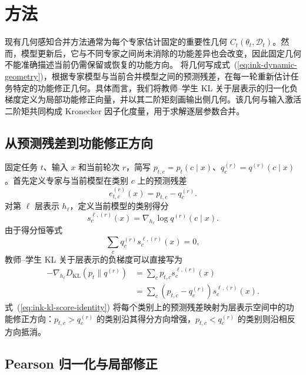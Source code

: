 \section{\method{} 方法}
\label{sec:ink-functional-geometry}



现有几何感知合并方法通常为每个专家估计固定的重要性几何 $C_t(\theta_t,\mathcal D_t)$。然而，模型更新后，它与不同专家之间尚未消除的功能差异也会改变，因此固定几何不能准确描述当前仍需保留或恢复的功能方向。\method{} 将几何写成式~(\ref{eq:ink-dynamic-geometry})，根据专家模型与当前合并模型之间的预测残差，在每一轮重新估计任务特定的功能修正几何。具体而言，我们将教师--学生 KL 关于层表示的归一化负梯度定义为局部功能修正向量，并以其二阶矩刻画输出侧几何。该几何与输入激活二阶矩共同构成 Kronecker 因子化度量，用于求解逐层参数合并。

\subsection{从预测残差到功能修正方向}

固定任务 $t$、输入 $x$ 和当前轮次 $r$，简写 $p_{t,c}=p_t(c\mid x)$、$q_c^{(r)}=q^{(r)}(c\mid x)$。首先定义专家与当前模型在类别 $c$ 上的预测残差
\begin{equation}
  e_{t,c}^{(r)}(x)
  =
  p_{t,c}-q_c^{(r)}.
  \label{eq:ink-prediction-residual}
\end{equation}
对第 $\ell$ 层表示 $h_\ell$，定义当前模型的类别得分
\begin{equation}
  s_c^{\ell,(r)}(x)
  =
  \nabla_{h_\ell}\log q^{(r)}(c\mid x).
\end{equation}
由于得分恒等式
\begin{equation}
  \sum_c q_c^{(r)}s_c^{\ell,(r)}(x)=0,
\end{equation}
教师--学生 KL 关于层表示的负梯度可以直接写为
\begin{align}
  -\nabla_{h_\ell}D_{\mathrm{KL}}(p_t\|q^{(r)})
  &= \sum_c p_{t,c}s_c^{\ell,(r)}(x) \\
  &= \sum_c \left(p_{t,c}-q_c^{(r)}\right)
     s_c^{\ell,(r)}(x).
  \label{eq:ink-kl-score-identity}
\end{align}
式~(\ref{eq:ink-kl-score-identity}) 将每个类别上的预测残差映射为层表示空间中的功能修正方向：$p_{t,c}>q_c^{(r)}$ 的类别沿其得分方向增强，$p_{t,c}<q_c^{(r)}$ 的类别则沿相反方向抵消。

\subsection{Pearson 归一化与局部修正}

